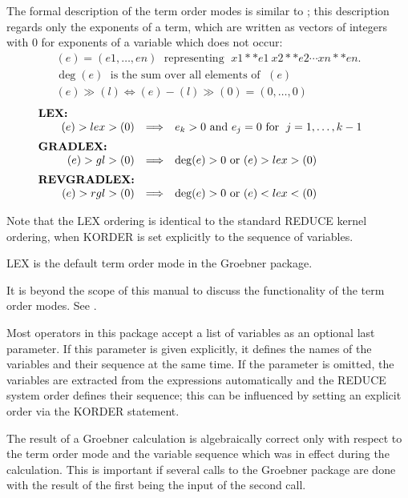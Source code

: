 The formal description of the term order modes is similar to
\cite{KRED88}; this description regards only the exponents of a term,
which are written as vectors of integers with $0$ for exponents of a
variable which does not occur: 
\[
\begin{array}{l}
  (e) = (e1,\ldots , en) \;\mbox{ representing }\; x1**e1 \ x2**e2 \cdots
  xn**en. \\
  \deg(e) \; \mbox{ is the sum over all elements of } \;(e) \\
  (e) \gg (l) \Longleftrightarrow (e)-(l)\gg (0) = (0,\ldots ,0)
\end{array}
\]
\[
\begin{array}{rll}
\multicolumn{1}{l}{\hspace*{-.5cm}\mbox{\bf LEX:}} \\
  (e) > lex > (0) & \Longrightarrow  & e_k > 0 \mbox{ and } e_j =0
\mbox{ for }\; j=1,\ldots , k-1\vspace*{2mm} \\
\multicolumn{1}{l}{\hspace*{-.5cm}\mbox{\bf
GRADLEX:}} \\
  (e) >gl> (0)  & \Longrightarrow  & \deg(e)>0  \mbox { or } (e) >lex>
(0)\vspace*{2mm} \\
\multicolumn{1}{l}{\hspace*{-.5cm}\mbox{\bf
REVGRADLEX:}}\\
  (e) >rgl> (0) & \Longrightarrow & \deg(e)>0  \mbox{ or }(e)  <lex<
(0)
\end{array}
\]

Note that the LEX ordering is identical to the standard REDUCE
kernel ordering, when KORDER is set explicitly to the sequence of
variables.

LEX is the default term order mode in the Groebner package.

It is beyond the scope of this manual to discuss the functionality of
the term order modes. See \cite{BUCH88}.

Most operators in this package accept a list of variables as an
optional last parameter. If this parameter is given explicitly, it
defines the names of the variables and their sequence at the same
time. If the parameter is omitted, the variables are extracted from
the expressions automatically and the REDUCE system order defines
their sequence; this can be influenced by setting an explicit order
via the KORDER statement.

The result of a Groebner calculation is algebraically correct only
with respect to the term order mode and the variable sequence
which was in effect during the calculation. This is important if
several calls to the Groebner package are done with the result of the
first being the input of the second call.

